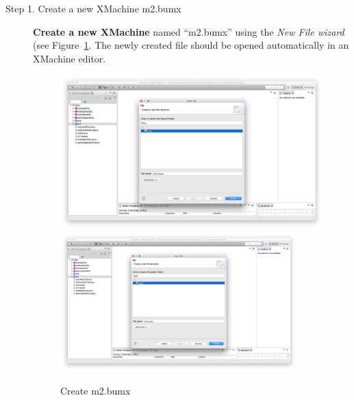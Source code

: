 \begin{description}
\item[Step 1. Create a new XMachine m2.bumx] \textbf{Create a new XMachine} named ``m2.bumx'' using the \emph{New File wizard} (see Figure~\ref{fig:CreateM2}. The newly created file should be opened automatically in an XMachine editor.
  \begin{figure}[!htbp]
    \centering
    \ifplastex
    \includegraphics[width=512]{figures/CreateM2}
    \else
    \includegraphics[width=0.9\textwidth]{figures/CreateM2}
    \fi
    \caption{Create m2.bumx}
    \label{fig:CreateM2}
  \end{figure}


\end{description}

